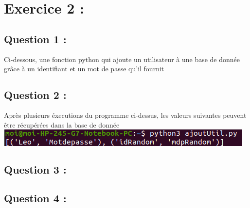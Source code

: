\documentclass{article}
\begin{document}
\section{Exercice 2 :}
    \subsection{Question 1 :}
        Ci-dessous, une fonction python qui ajoute un utilisateur à une base de donnée grâce à un identifiant et un mot de passe qu'il fournit
        
    \subsection{Question 2 :}
        Après plusieurs éxecutions du programme ci-dessus, les valeurs suivantes peuvent être récupérées dans la base de donnée\newline
        \includegraphics[scale = 0.5]{ajoutUtil.png}
    \subsection{Question 3 :}
        
    \subsection{Question 4 :}
        
\end{document}
